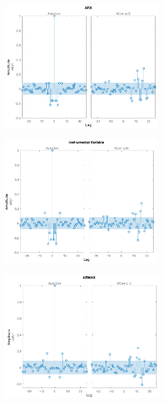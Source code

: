 \begin{figure}[h]
	\centering
	\begin{subfigure}{.49\textwidth}
		\includegraphics[height=5.5cm]{figures/v_arx.png}
		\label{fig:v_arx}
	\end{subfigure}\hfill
	\begin{subfigure}{.49\textwidth}
		\includegraphics[height=5.5cm]{figures/v_iv.png}
		\label{fig:v_iv4}
	\end{subfigure}
	\begin{subfigure}{.49\textwidth}
		\includegraphics[height=5.5cm]{figures/v_armax.png}
		\label{fig:v_armax}
	\end{subfigure}\hfill
	\begin{subfigure}{.49\textwidth}

\end{subfigure}
\end{figure}
